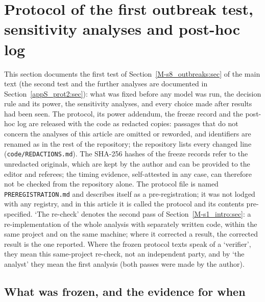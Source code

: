 \section{Protocol of the first outbreak test, sensitivity analyses and post-hoc log}\label{appC_protocol:sec}

This section documents the first test of Section~\ref{M-s8_outbreaks:sec} of the main text (the second test and the
further analyses are documented in Section~\ref{appS_prot2:sec}): what was fixed before any model was run,
the decision rule and its power, the sensitivity analyses, and every choice made after results had been seen.
The protocol, its power addendum, the freeze record and the post-hoc log are released with the code as
redacted copies: passages that do not concern the analyses of this article are omitted or reworded, and
identifiers are renamed as in the rest of the repository; the repository lists every changed line
(\texttt{code/REDACTIONS.md}). The SHA-256 hashes of the freeze records refer to the unredacted originals, which
are kept by the author and can be provided to the editor and referees; the timing evidence, self-attested in any
case, can therefore not be checked from the repository alone.
The protocol file is named \texttt{PREREGISTRATION.md} and describes itself as a pre-registration; it was not
lodged with any registry, and in this article it is called the protocol and its contents pre-specified.
`The re-check' denotes the second pass of Section~\ref{M-s1_intro:sec}: a re-implementation of the whole
analysis with separately written code, within the same project and on the same machine; where it corrected a
result, the corrected result is the one reported. Where the frozen protocol texts speak of a
`verifier', they mean this same-project re-check, not an independent party, and
by `the analyst' they mean the first analysis (both passes were made by the author).

\subsection{What was frozen, and the evidence for when}\label{appC_protocol:sec:freeze}


